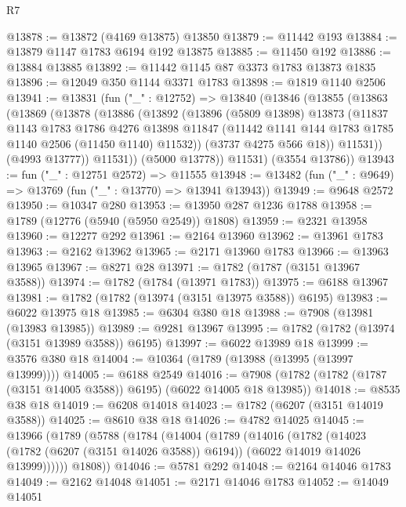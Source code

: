 \begin{lexlean}{R7}
\begin{coremodule}
@13878 := @13872 (@4169 @13875) @13850
@13879 := @11442 @193
@13884 := @13879 @1147 @1783 @6194 @192 @13875
@13885 := @11450 @192
@13886 := @13884 @13885
@13892 := @11442 @1145 @87 @3373 @1783 @13873 @1835
@13896 := @12049 @350 @1144 @3371 @1783
@13898 := @1819 @1140 @2506
@13941 := @13831
    (fun ("_" : @12752) =>
    @13840
      (@13846
        (@13855
          (@13863
            (@13869
              (@13878
                (@13886
                  (@13892
                    (@13896
                      (@5809 @13898)
                      @13873
                      (@11837
                        @1143
                        @1783
                        @1786
                        @4276
                        @13898
                        @11847
                        (@11442 @1141 @144 @1783 @1785 @1140 @2506 (@11450 @1140) @11532))
                      (@3737 @4275 @566 @18))
                    @11531))
                (@4993 @13777))
              @11531))
          (@5000 @13778))
        @11531)
      (@3554 @13786))
@13943 := fun ("_" : @12751 @2572) => @11555
@13948 := @13482 (fun ("_" : @9649) => @13769 (fun ("_" : @13770) => @13941 @13943))
@13949 := @9648 @2572
@13950 := @10347 @280
@13953 := @13950 @287 @1236 @1788
@13958 := @1789 (@12776 (@5940 (@5950 @2549)) @1808)
@13959 := @2321 @13958
@13960 := @12277 @292
@13961 := @2164 @13960
@13962 := @13961 @1783
@13963 := @2162 @13962
@13965 := @2171 @13960 @1783
@13966 := @13963 @13965
@13967 := @8271 @28
@13971 := @1782 (@1787 (@3151 @13967 @3588))
@13974 := @1782 (@1784 (@13971 @1783))
@13975 := @6188 @13967
@13981 := @1782 (@1782 (@13974 (@3151 @13975 @3588)) @6195)
@13983 := @6022 @13975 @18
@13985 := @6304 @380 @18
@13988 := @7908 (@13981 (@13983 @13985))
@13989 := @9281 @13967
@13995 := @1782 (@1782 (@13974 (@3151 @13989 @3588)) @6195)
@13997 := @6022 @13989 @18
@13999 := @3576 @380 @18
@14004 := @10364 (@1789 (@13988 (@13995 (@13997 @13999))))
@14005 := @6188 @2549
@14016 := @7908 (@1782 (@1782 (@1787 (@3151 @14005 @3588)) @6195) (@6022 @14005 @18 @13985))
@14018 := @8535 @38 @18
@14019 := @6208 @14018
@14023 := @1782 (@6207 (@3151 @14019 @3588))
@14025 := @8610 @38 @18
@14026 := @4782 @14025
@14045 := @13966
    (@1789
      (@5788
        (@1784
          (@14004
            (@1789
              (@14016
                (@1782
                  (@14023 (@1782 (@6207 (@3151 @14026 @3588)) @6194))
                  (@6022 @14019 @14026 @13999))))))
        @1808))
@14046 := @5781 @292
@14048 := @2164 @14046 @1783
@14049 := @2162 @14048
@14051 := @2171 @14046 @1783
@14052 := @14049 @14051

\end{coremodule}
\end{lexlean}
